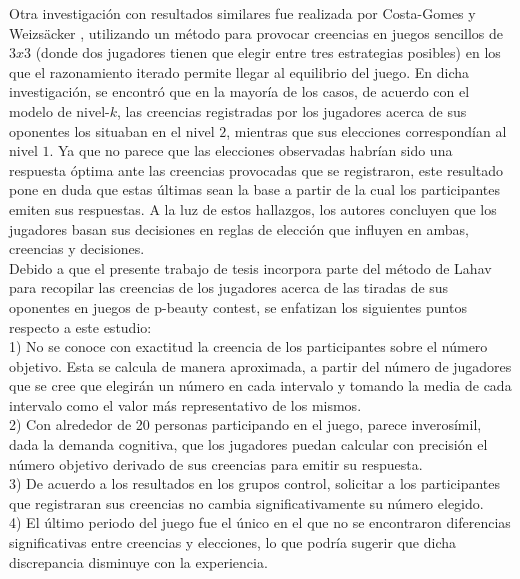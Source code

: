 Otra investigación con resultados similares fue realizada por Costa-Gomes y Weizsäcker \parencite*{Costa-Gomes2008}, utilizando un método para provocar creencias en juegos sencillos de $3x3$ (donde dos jugadores tienen que elegir entre tres estrategias posibles) en los que el razonamiento iterado permite llegar al equilibrio del juego. En dicha investigación, se encontró que en la mayoría de los casos, de acuerdo con el modelo de nivel-$k$, las creencias registradas por los jugadores acerca de sus oponentes los situaban en el nivel $2$, mientras que sus elecciones correspondían al nivel $1$. Ya que no parece que las  elecciones observadas habrían sido una respuesta óptima ante las creencias provocadas que se registraron, este resultado pone en duda que estas últimas sean la base a partir de la cual los participantes emiten sus respuestas. A la luz de estos hallazgos, los autores concluyen que los jugadores basan sus decisiones en reglas de elección que influyen en ambas, creencias y decisiones.\\

Debido a que el presente trabajo de tesis incorpora parte del método de Lahav \parencite*{Lahav2015} para recopilar las creencias de los jugadores acerca de las tiradas de sus oponentes en juegos de p-beauty contest, se enfatizan los siguientes puntos respecto a este estudio: \\

1) No se conoce con exactitud la creencia de los participantes sobre el número objetivo. Esta se calcula de manera aproximada, a partir del número de jugadores que se cree que elegirán un número en cada intervalo y tomando la media de cada intervalo como el valor más representativo de los mismos.\\

2) Con alrededor de 20 personas participando en el juego, parece inverosímil, dada la demanda cognitiva, que los jugadores puedan calcular con precisión el número objetivo derivado de sus creencias para emitir su respuesta.\\

3) De acuerdo a los resultados en los grupos control, solicitar a los participantes que registraran sus creencias no cambia significativamente  su número elegido.\\

4) El último periodo del juego fue el único en el que no se encontraron diferencias significativas entre creencias y elecciones, lo que podría sugerir que dicha discrepancia disminuye con la experiencia.\\


